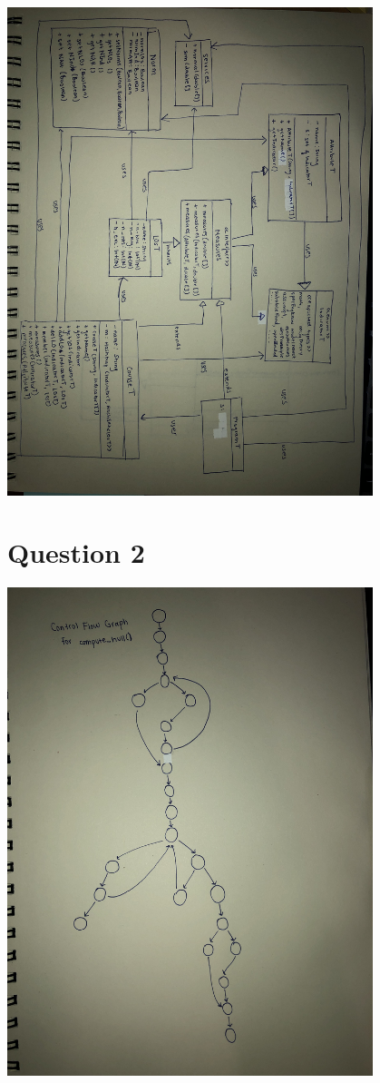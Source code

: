 \documentclass[12pt]{article}
\begin{document}
\begin{center}
  \includegraphics[width=0.8\textwidth]{UML.jpg}
\end{center}

\section* {Question 2}

\begin{center}
  \includegraphics[width=0.8\textwidth, angle = 270]{CFG.jpg}
\end{center}
\end{document}
